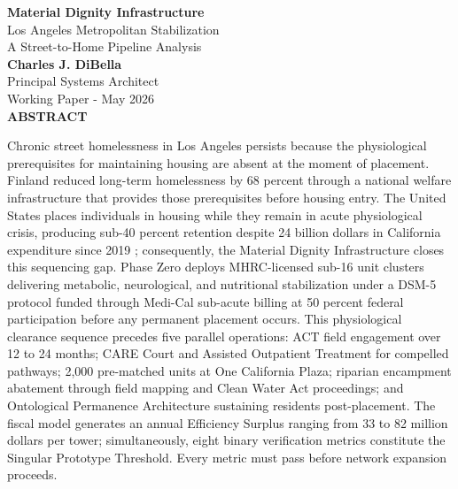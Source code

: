 \documentclass[12pt, letterpaper]{article}
\begin{document}
\captionsetup[table]{labelfont=normalfont, labelsep=period, skip=6pt}

\begin{titlepage}
\begin{center}
{\LARGE \textbf{Material Dignity Infrastructure}}\\[6pt]
{\large Los Angeles Metropolitan Stabilization\\[2pt]
A Street-to-Home Pipeline Analysis}\\[1.0cm]
{\normalsize \textbf{Charles J. DiBella}}\\[0.01cm]
{\normalsize Principal Systems Architect}\\[0.01cm]
{\normalsize Working Paper - May 2026}\\[0.5cm]
\textbf{ABSTRACT}
\vspace{0.5cm}
\end{center}
\begin{minipage}{0.95\textwidth}
\noindent

Chronic street homelessness in Los Angeles persists because the physiological prerequisites for maintaining housing are absent at the moment of placement. Finland reduced long-term homelessness by 68 percent through a national welfare infrastructure that provides those prerequisites before housing entry. The United States places individuals in housing while they remain in acute physiological crisis, producing sub-40 percent retention despite 24 billion dollars in California expenditure since 2019 \citep{ucsf_bhhi_2023}; consequently, the Material Dignity Infrastructure closes this sequencing gap. Phase Zero deploys MHRC-licensed sub-16 unit clusters delivering metabolic, neurological, and nutritional stabilization under a DSM-5 protocol funded through Medi-Cal sub-acute billing at 50 percent federal participation before any permanent placement occurs. This physiological clearance sequence precedes five parallel operations: ACT field engagement over 12 to 24 months; CARE Court and Assisted Outpatient Treatment for compelled pathways; 2,000 pre-matched units at One California Plaza; riparian encampment abatement through field mapping and Clean Water Act proceedings; and Ontological Permanence Architecture sustaining residents post-placement. The fiscal model generates an annual Efficiency Surplus ranging from 33 to 82 million dollars per tower; simultaneously, eight binary verification metrics constitute the Singular Prototype Threshold. Every metric must pass before network expansion proceeds.
\end{minipage}
\end{titlepage}
\end{document}
